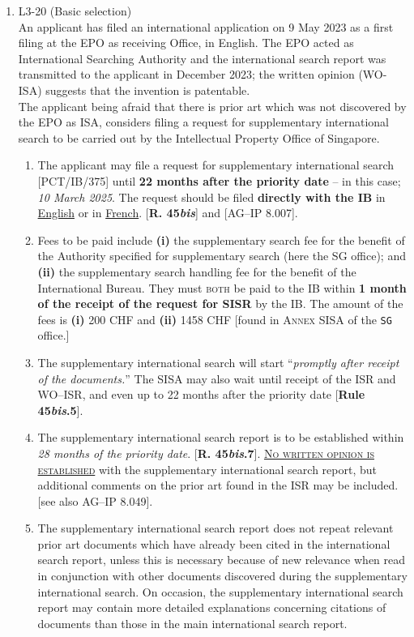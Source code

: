 \documentclass{report}
\begin{document}
\begin{enumerate}[label=\textbf{Answer \arabic*}]
    \item %
    L3-20 (Basic selection) \\
    An applicant has filed an international application on 9 May 2023 as a first filing at the EPO as receiving Office, in English. The EPO acted as International Searching Authority and the international search report was transmitted to the applicant in December 2023; the written opinion (WO-ISA) suggests that the invention is patentable. \\
    The applicant being afraid that there is prior art which was not discovered by the EPO as ISA, considers filing a request for supplementary international search to be carried out by the Intellectual Property Office of Singapore.
    \begin{enumerate}[label=(\alph*)]
        \item The applicant may file a request for supplementary international search [\textsc{PCT/IB/375}] until \textbf{22 months after the priority date} -- in this case; \textit{10 March 2025}. The request should be filed \textbf{directly with the IB} in \underline{English} or in \underline{French}. [\textbf{R. 45\textit{bis}}] and [\textsc{AG--IP 8.007}].
        \item Fees to be paid include \textbf{(i)} the supplementary search fee for the benefit of the Authority specified for supplementary search (here the \textsc{SG} office); and \textbf{(ii)} the supplementary search handling fee for the benefit of the International Bureau.
        They must \textsc{both} be paid to the IB within \textbf{1 month of the receipt of the request for SISR} by the IB.
        The amount of the fees is \textbf{(i)} 200 \textsc{CHF} and \textbf{(ii)} 1458 \textsc{CHF} [found in \textsc{Annex SISA} of the \texttt{SG} office.]
        \item The supplementary international search will start ``\textit{promptly after receipt of the documents.}'' The SISA may also wait until receipt of the ISR and WO--ISR, and even up to 22 months after the priority date [\textbf{Rule 45\textit{bis}.5}].
        \item The supplementary international search report is to be established within \textit{28 months of the priority date}. [\textbf{R. 45\textit{bis}.7}]. \underline{\textsc{No written opinion is established}} with the supplementary international search report, but additional comments on the prior art found in the ISR may be included. [see also \textsc{AG--IP 8.049}].
        \item The supplementary international search report does not repeat relevant prior art documents which have already been cited in the international search report, unless this is necessary because of new relevance when read in conjunction with other documents discovered during the supplementary international search. On occasion, the supplementary international search report may contain more detailed explanations concerning citations of documents than those in the main international search report.

\end{enumerate}
\end{enumerate}
\end{document}
